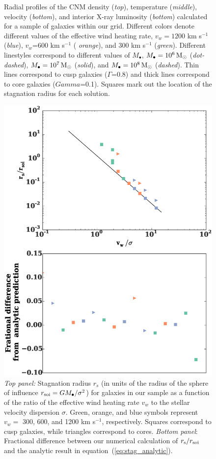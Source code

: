 \documentclass[usenatbib,fleqn]{mn2e}
\newcommand{\Mbh}[1][]{M_{\bullet#1}}
\newcommand{\vwO}{v_{w}}
\begin{document}
\begin{figure}
  \caption{\label{fig:profiles}Radial profiles of the CNM density
    ({\it top}), temperature ({\it middle}), velocity ({\it bottom}),
    and interior X-ray luminosity ({\it bottom}) calculated for a
    sample of galaxies within our grid.  Different colors
    denote different values of the effective wind heating rate,
    $\vwO=1200$ km s$^{-1}$ ({\it blue}), $\vwO$=600 km s$^{-1}$ ({\it
      orange}), and 300 km s$^{-1}$ ({\it green}).  Different
    linestyles correspond to different values of $\Mbh$, $\Mbh=10^6
    \Msun$ ({\it dot-dashed}), $\Mbh=10^7 \Msun$ ({\it solid}), and
    $\Mbh=10^8 \Msun$ ({\it dashed}). Thin lines correspond to cusp
    galaxies ($\Gamma$=0.8) and thick lines correspond to core
    galaxies ($Gamma$=0.1). Squares mark out the location of
    the stagnation radius for each solution.
 }
\end{figure}

\begin{figure}
  \includegraphics[width=\columnwidth]{rs.eps}
  \caption{\label{fig:stag} \emph{Top panel:} Stagnation radius
    $r_{s}$ (in units of the radius of the sphere of influence $r_{\rm
      soi} = GM_{\bullet}/\sigma^{2}$) for galaxies in our sample as a
    function of the ratio of the effective wind heating rate $v_{w}$
    to the stellar velocity dispersion $\sigma$.  Green, orange, and
    blue symbols represent $v_{w} =$ 300, 600, and 1200 km s$^{-1}$,
    respectively.  Squares correspond to cusp galaxies, while
    triangles correspond to cores. \emph{Bottom panel}: Fractional
    difference between our numerical calculation of $r_{\rm s}/r_{\rm
      soi}$ and the analytic result in
    equation~(\ref{eq:stag_analytic}). }
\end{figure}
\end{document}
